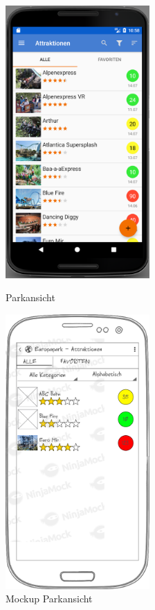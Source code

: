 \begin{figure}[h]
    \centering
    \begin{minipage}{0.49\textwidth}
        \centering
        \includegraphics[width=0.49\textwidth]{img/screenshots/ss_attraktionsuebersicht.png}
        \caption{Parkansicht}
		\label{figure:implementierungattraktionsuebersicht}
    \end{minipage}
    \begin{minipage}{0.49\textwidth}
        \centering
        \includegraphics[width=0.49\textwidth]{img/mockups/m_attraktionsuebersicht.png}
        \caption{Mockup Parkansicht}
    \end{minipage}
\end{figure}

